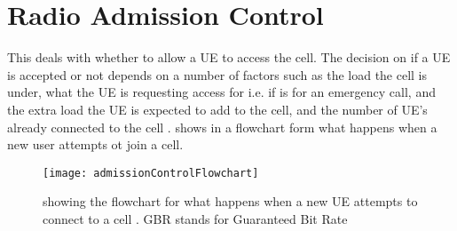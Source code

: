 \section{Radio Admission Control}
{
	This deals with whether to allow a UE to access the cell. The decision on if a UE is accepted or not depends on a number of factors such as the load the cell is under, what the UE is requesting access for i.e. if is for an emergency call, and the extra load the UE is expected to add to the cell, and the number of UE's already connected to the cell \cite{RadioAdmissionControl5594566}.  shows in a flowchart form what happens when a new user attempts ot join a cell.
	\begin{figure}
		\centering
		\texttt{[image: admissionControlFlowchart]}
		\caption{showing the flowchart for what happens when a new UE attempts to connect to a cell \cite{RadioAdmissionControlPaolo}. GBR stands for Guaranteed Bit Rate}
		\label{fig:RACFlowchart}
	\end{figure}
}